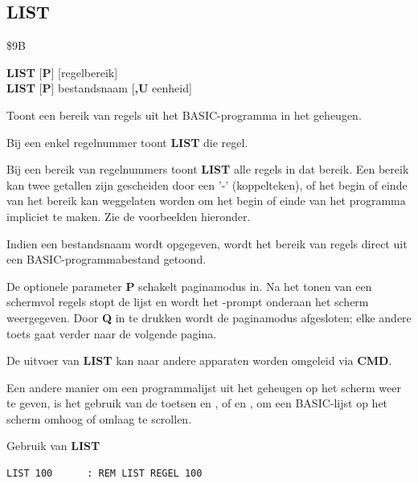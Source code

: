 
\label{BASIC 65 Commands!LIST}
\newpage
\subsection{LIST}
\begin{description}[leftmargin=2cm,style=nextline]
\item [Token:]    \$9B

\item [Formaat:]   {\bf LIST} [{\bf P}] [regelbereik] \\                 {\bf LIST} [{\bf P}] bestandsnaam [{\bf,U} eenheid]

\item [Gebruik:]    Toont een bereik van regels uit het BASIC-programma in het geheugen.

                  Bij een enkel regelnummer toont {\bf LIST} die regel.

                  Bij een bereik van regelnummers toont {\bf LIST} alle regels in dat bereik. Een bereik kan twee getallen zijn gescheiden door een '-' (koppelteken), of het begin of einde van het bereik kan weggelaten worden om het begin of einde van het programma impliciet te maken. Zie de voorbeelden hieronder.

                  Indien een bestandsnaam wordt opgegeven, wordt het bereik van regels direct uit een BASIC-programmabestand getoond.

\item [Opmerkingen:]  De optionele parameter {\bf P} schakelt paginamodus in. Na het tonen van een schermvol regels stopt de lijst en wordt het \screentext{[MORE]}-prompt onderaan het scherm weergegeven. Door {\bf Q} in te drukken wordt de paginamodus afgesloten; elke andere toets gaat verder naar de volgende pagina.

                  De uitvoer van {\bf LIST} kan naar andere apparaten worden omgeleid via {\bf CMD}.

                  Een andere manier om een programmalijst uit het geheugen op het scherm weer te geven, is het gebruik van de toetsen  en , of   en  , om een BASIC-lijst op het scherm omhoog of omlaag te scrollen.

\item [Voorbeelden:] Gebruik van {\bf LIST}

\begin{tcolorbox}[colback=black,coltext=white]
\verbatimfont{\codefont}
\begin{verbatim}
LIST 100      : REM LIST REGEL 100


\end{verbatim}
\end{tcolorbox}
\end{description}
